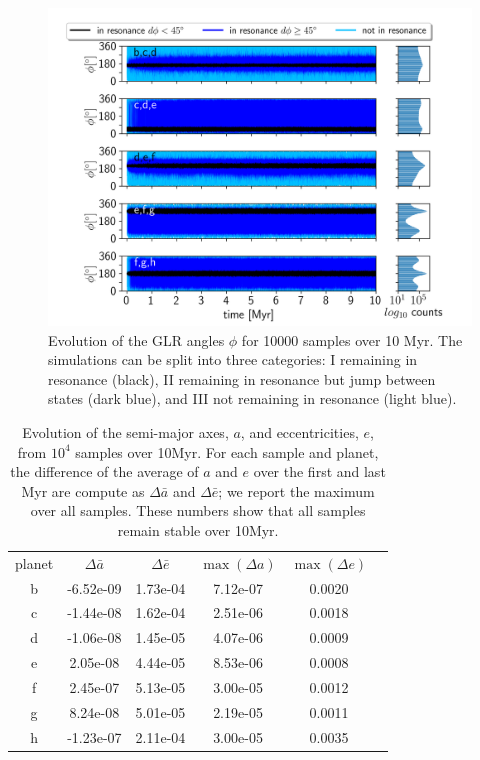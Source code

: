 \documentclass[fleqn,usenatbib]{mnras} %
\begin{document}
\begin{figure}
    \centering
    \includegraphics[width =\hsize]{figures/tlM.png}
    \caption{Evolution of the GLR angles $\phi$ for 10000 samples over 10 Myr. The simulations can be split into three categories: I remaining in resonance (black), II remaining in resonance but jump between states (dark blue), and III not remaining in resonance (light blue).}
    \label{fig:tlM}
\end{figure}

\begin{table}
\centering
\begin{tabular}{|c|c c c c c}
planet & $\Delta \bar{a}$ & $\Delta \bar{e}$ & $\max (\Delta a)$ & $\max(\Delta e)$ &\\ 
b      & -6.52e-09  & 1.73e-04 & 7.12e-07  & 0.0020 \\
c      & -1.44e-08  & 1.62e-04 & 2.51e-06  & 0.0018 \\
d      & -1.06e-08  & 1.45e-05 & 4.07e-06  & 0.0009 \\
e      &  2.05e-08  & 4.44e-05 & 8.53e-06  & 0.0008 \\
f      &  2.45e-07  & 5.13e-05 & 3.00e-05  & 0.0012 \\
g      &  8.24e-08  & 5.01e-05 & 2.19e-05  & 0.0011 \\
h      & -1.23e-07  & 2.11e-04 & 3.00e-05  & 0.0035

\end{tabular}
\caption{Evolution of the semi-major axes, $a$, and eccentricities, $e$, from $10^4$ samples over 10Myr. For each sample and planet, the difference of the average of $a$ and $e$ over the first and last Myr are compute as $\Delta \bar{a}$ and  $\Delta \bar{e}$; we report the maximum over all samples. These numbers show that all samples remain stable over 10Myr.}
\label{tab:averageAE}
\end{table}
\end{document}
